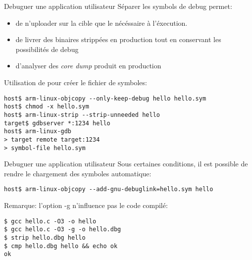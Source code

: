 \begin{frame}[fragile=singleslide]{Debuguer une application utilisateur}
  Séparer les symbols  de debug permet:
  \begin{itemize}
  \item de n'uploader sur la cible que le nécéssaire à l'éxecution.
  \item  de  livrer  des  binaires  strippées en  production  tout  en
    conservant les possibilités de debug
  \item d'analyser des \emph{core dump} produit en production
  \end{itemize}
  Utilisation de  pour créer le fichier de symboles:
  \begin{lstlisting}
host$ arm-linux-objcopy --only-keep-debug hello hello.sym
host$ chmod -x hello.sym
host$ arm-linux-strip --strip-unneeded hello 
target$ gdbserver *:1234 hello
host$ arm-linux-gdb
> target remote target:1234
> symbol-file hello.sym
    \end{lstlisting} 
\end{frame}
  
\begin{frame}[fragile=singleslide]{Debuguer une application utilisateur}
  Sous certaines conditions, il est possible de rendre le chargement
  des symboles automatique:
  \begin{lstlisting}
host$ arm-linux-objcopy --add-gnu-debuglink=hello.sym hello
  \end{lstlisting}  
  Remarque: l'option -g n'influence pas le code compilé:
    \begin{lstlisting}
$ gcc hello.c -O3 -o hello
$ gcc hello.c -O3 -g -o hello.dbg
$ strip hello.dbg hello
$ cmp hello.dbg hello && echo ok
ok
    \end{lstlisting}  %
\end{frame}

